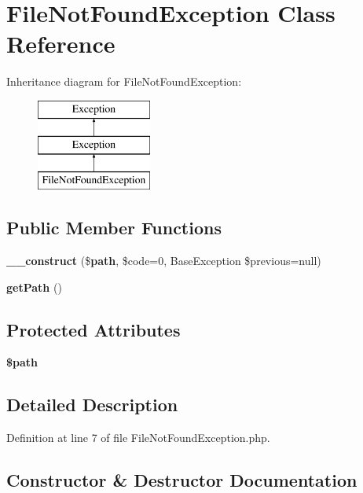 \section{File\+Not\+Found\+Exception Class Reference}
\label{class_league_1_1_flysystem_1_1_file_not_found_exception}
Inheritance diagram for File\+Not\+Found\+Exception\+:\begin{figure}[H]
\begin{center}
\leavevmode
\includegraphics[height=3.000000cm]{class_league_1_1_flysystem_1_1_file_not_found_exception}
\end{center}
\end{figure}
\subsection*{Public Member Functions}
\begin{DoxyCompactItemize}
\item 
{\bf \+\_\+\+\_\+construct} (\${\bf path}, \$code=0, Base\+Exception \$previous=null)
\item 
{\bf get\+Path} ()
\end{DoxyCompactItemize}
\subsection*{Protected Attributes}
\begin{DoxyCompactItemize}
\item 
{\bf \$path}
\end{DoxyCompactItemize}


\subsection{Detailed Description}


Definition at line 7 of file File\+Not\+Found\+Exception.\+php.



\subsection{Constructor \& Destructor Documentation}
